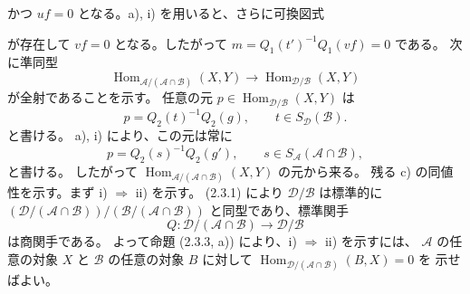 \clearpage
{}%
\begingroup
\small
\setlength{\parskip}{0pt}%
\setlength{\emergencystretch}{1.5em}%
\setlength{\abovedisplayskip}{3pt plus 1pt minus 1pt}%
\setlength{\belowdisplayskip}{3pt plus 1pt minus 1pt}%
\sloppy

\noindent かつ $uf=0$ となる。a), i) を用いると、さらに可換図式
\begin{center}
\end{center}
\noindent が存在して $vf=0$ となる。したがって
$m=Q_1(t')^{-1}Q_1(vf)=0$ である。
次に準同型
\[
 \operatorname{Hom}_{\mathcal A/(\mathcal A\cap\mathcal B)}(X,Y)
 \longrightarrow\operatorname{Hom}_{\mathcal D/\mathcal B}(X,Y)
\]
が全射であることを示す。
任意の元 $p\in\operatorname{Hom}_{\mathcal D/\mathcal B}(X,Y)$ は
\[
 p=Q_2(t)^{-1}Q_2(g),\qquad t\in S_{\mathcal D}(\mathcal B)
  .
\]
と書ける。
a), i) により、この元は常に
\[
 p=Q_2(s)^{-1}Q_2(g'),\qquad
 s\in S_{\mathcal A}(\mathcal A\cap\mathcal B),
\]
と書ける。
したがって $\operatorname{Hom}_{\mathcal A/(\mathcal A\cap\mathcal B)}(X,Y)$
の元から来る。
残る c) の同値性を示す。まず i) $\Rightarrow$ ii) を示す。
(2.3.1) により $\mathcal D/\mathcal B$ は標準的に
$(\mathcal D/(\mathcal A\cap\mathcal B))
/(\mathcal B/(\mathcal A\cap\mathcal B))$ と同型であり、標準関手
\[
 Q\colon\mathcal D/(\mathcal A\cap\mathcal B)\longrightarrow\mathcal D/\mathcal B
\]
は商関手である。
よって命題 (2.3.3, a)) により、i) $\Rightarrow$ ii) を示すには、
$\mathcal A$ の任意の対象 $X$ と
$\mathcal B$ の任意の対象 $B$ に対して
$\operatorname{Hom}_{\mathcal D/(\mathcal A\cap\mathcal B)}(B,X)=0$ を
示せばよい。
